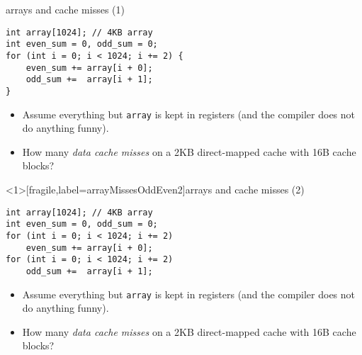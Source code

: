 \begin{frame}[fragile,label=arrayMissesOddEven1]{arrays and cache misses (1)}
\begin{lstlisting}
int array[1024]; // 4KB array
int even_sum = 0, odd_sum = 0;
for (int i = 0; i < 1024; i += 2) {
    even_sum += array[i + 0];
    odd_sum +=  array[i + 1];
}
\end{lstlisting}
    \begin{itemize}
        \item {\small
Assume everything but {\tt array} is kept in registers (and the compiler does not do
            anything funny).}
\item
How many \textit{data cache misses} on a 2KB direct-mapped cache with 16B cache blocks?
    \end{itemize}
\end{frame}

\begin{frame}<1>[fragile,label=arrayMissesOddEven2]{arrays and cache misses (2)}
\begin{lstlisting}
int array[1024]; // 4KB array
int even_sum = 0, odd_sum = 0;
for (int i = 0; i < 1024; i += 2)
    even_sum += array[i + 0];
for (int i = 0; i < 1024; i += 2)
    odd_sum +=  array[i + 1];
\end{lstlisting}
    \begin{itemize}
        \item {\small
    Assume everything but {\tt array} is kept in registers (and the compiler does not do
    anything funny).
        }
    \item
How many \textit{data cache misses} on a 2KB direct-mapped cache with 16B cache blocks?
    \end{itemize}
\end{frame}

